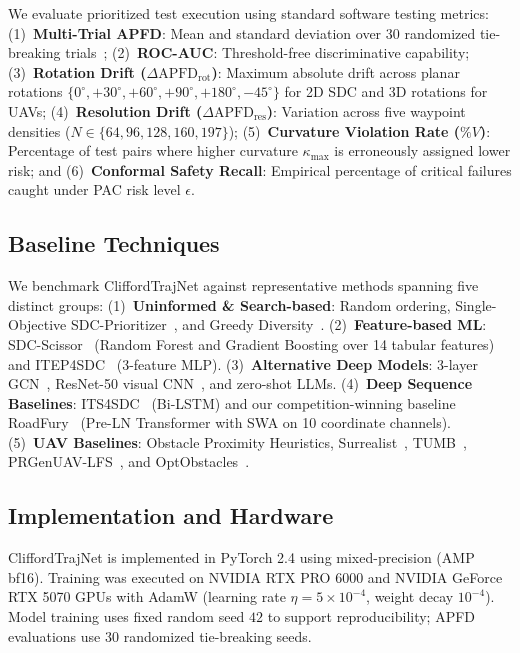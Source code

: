 We evaluate prioritized test execution using standard software testing metrics: (1)~\textbf{Multi-Trial APFD}: Mean and standard deviation over $30$ randomized tie-breaking trials~\cite{roadfury}; (2)~\textbf{ROC-AUC}: Threshold-free discriminative capability; (3)~\textbf{Rotation Drift ($\Delta\mathrm{APFD}_{\mathrm{rot}}$)}: Maximum absolute drift across planar rotations $\{0^\circ, +30^\circ, +60^\circ, +90^\circ, +180^\circ, -45^\circ\}$ for 2D SDC and 3D rotations for UAVs; (4)~\textbf{Resolution Drift ($\Delta\mathrm{APFD}_{\mathrm{res}}$)}: Variation across five waypoint densities ($N \in \{64, 96, 128, 160, 197\}$); (5)~\textbf{Curvature Violation Rate ($\%V$)}: Percentage of test pairs where higher curvature $\kappa_{\max}$ is erroneously assigned lower risk; and (6)~\textbf{Conformal Safety Recall}: Empirical percentage of critical failures caught under PAC risk level $\epsilon$.

\subsection{Baseline Techniques}

We benchmark CliffordTrajNet against representative methods spanning five distinct groups: (1)~\textbf{Uninformed \& Search-based}: Random ordering, Single-Objective SDC-Prioritizer~\cite{sdcprio}, and Greedy Diversity~\cite{sdcprio}. (2)~\textbf{Feature-based ML}: SDC-Scissor~\cite{sdcscissor} (Random Forest and Gradient Boosting over 14 tabular features) and ITEP4SDC~\cite{roadfury} (3-feature MLP). (3)~\textbf{Alternative Deep Models}: 3-layer GCN~\cite{gcn}, ResNet-50 visual CNN~\cite{resnet}, and zero-shot LLMs. (4)~\textbf{Deep Sequence Baselines}: ITS4SDC~\cite{its4sdc} (Bi-LSTM) and our competition-winning baseline RoadFury~\cite{roadfury} (Pre-LN Transformer with SWA on 10 coordinate channels). (5)~\textbf{UAV Baselines}: Obstacle Proximity Heuristics, Surrealist~\cite{roadfury}, TUMB~\cite{tumb}, PRGenUAV-LFS~\cite{uavcomp}, and OptObstacles~\cite{optobstacles}.

\subsection{Implementation and Hardware}

CliffordTrajNet is implemented in PyTorch 2.4 using mixed-precision (AMP bf16). Training was executed on NVIDIA RTX PRO 6000 and NVIDIA GeForce RTX 5070 GPUs with AdamW (learning rate $\eta = 5 \times 10^{-4}$, weight decay $10^{-4}$). Model training uses fixed random seed $42$ to support reproducibility; APFD evaluations use 30 randomized tie-breaking seeds.
